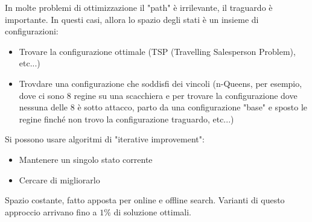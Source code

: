 \documentclass[a4paper]{article}
\begin{document}
In molte problemi di ottimizzazione il "path" è irrilevante,
il traguardo è importante. In questi casi, allora lo spazio degli stati è 
un insieme di configurazioni:
\begin{itemize}
  \item Trovare la configurazione ottimale (TSP (Travelling Salesperson Problem), etc...)
  \item Trovdare una configurazione che soddisfi dei vincoli (n-Queens, per esempio, dove 
  ci sono 8 regine su una scacchiera e per trovare la configurazione
  dove nessuna delle 8 è sotto attacco, parto da una configurazione "base"
  e sposto le regine finché non trovo la configurazione traguardo, etc...)
\end{itemize}
Si possono usare algoritmi di "iterative improvement": 
\begin{itemize}
  \item Mantenere un singolo stato corrente
  \item Cercare di migliorarlo
\end{itemize}
Spazio costante, fatto apposta per online e offline search. 
Varianti di questo approccio arrivano fino a $1\%$ di soluzione ottimali.
\end{document}
